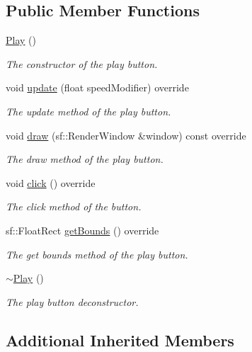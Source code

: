 \subsection*{Public Member Functions}
\begin{DoxyCompactItemize}
\item 
\hyperlink{class_play_a0088438837d29378e35a2beed04e64df}{Play} ()
\begin{DoxyCompactList}\small\item\em The constructor of the play button. \end{DoxyCompactList}\item 
void \hyperlink{class_play_ae8b65105669a71c09901aae7b7e6f764}{update} (float speed\+Modifier) override
\begin{DoxyCompactList}\small\item\em The update method of the play button. \end{DoxyCompactList}\item 
void \hyperlink{class_play_a7c37c48004f8c4a6753d4cac96767e3f}{draw} (sf\+::\+Render\+Window \&window) const override
\begin{DoxyCompactList}\small\item\em The draw method of the play button. \end{DoxyCompactList}\item 
void \hyperlink{class_play_abacc901bd17776b87850e333d82f3de3}{click} () override
\begin{DoxyCompactList}\small\item\em The click method of the button. \end{DoxyCompactList}\item 
sf\+::\+Float\+Rect \hyperlink{class_play_a84476fc81a6431c85098d31f243a2cd8}{get\+Bounds} () override
\begin{DoxyCompactList}\small\item\em The get bounds method of the play button. \end{DoxyCompactList}\item 
\hyperlink{class_play_a6f7dd4d097454caef2e81fa94fe739d5}{$\sim$\+Play} ()
\begin{DoxyCompactList}\small\item\em The play button deconstructor. \end{DoxyCompactList}\end{DoxyCompactItemize}
\subsection*{Additional Inherited Members}


